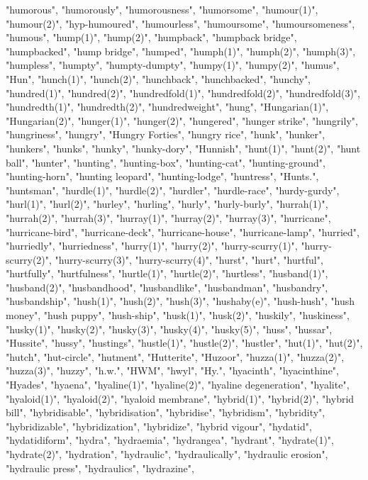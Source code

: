 "humorous",
"humorously",
"humorousness",
"humorsome",
"humour(1)",
"humour(2)",
"hyp-humoured",
"humourless",
"humoursome",
"humoursomeness",
"humous",
"hump(1)",
"hump(2)",
"humpback",
"humpback bridge",
"humpbacked",
"hump bridge",
"humped",
"humph(1)",
"humph(2)",
"humph(3)",
"humpless",
"humpty",
"humpty-dumpty",
"humpy(1)",
"humpy(2)",
"humus",
"Hun",
"hunch(1)",
"hunch(2)",
"hunchback",
"hunchbacked",
"hunchy",
"hundred(1)",
"hundred(2)",
"hundredfold(1)",
"hundredfold(2)",
"hundredfold(3)",
"hundredth(1)",
"hundredth(2)",
"hundredweight",
"hung",
"Hungarian(1)",
"Hungarian(2)",
"hunger(1)",
"hunger(2)",
"hungered",
"hunger strike",
"hungrily",
"hungriness",
"hungry",
"Hungry Forties",
"hungry rice",
"hunk",
"hunker",
"hunkers",
"hunks",
"hunky",
"hunky-dory",
"Hunnish",
"hunt(1)",
"hunt(2)",
"hunt ball",
"hunter",
"hunting",
"hunting-box",
"hunting-cat",
"hunting-ground",
"hunting-horn",
"hunting leopard",
"hunting-lodge",
"huntress",
"Hunts.",
"huntsman",
"hurdle(1)",
"hurdle(2)",
"hurdler",
"hurdle-race",
"hurdy-gurdy",
"hurl(1)",
"hurl(2)",
"hurley",
"hurling",
"hurly",
"hurly-burly",
"hurrah(1)",
"hurrah(2)",
"hurrah(3)",
"hurray(1)",
"hurray(2)",
"hurray(3)",
"hurricane",
"hurricane-bird",
"hurricane-deck",
"hurricane-house",
"hurricane-lamp",
"hurried",
"hurriedly",
"hurriedness",
"hurry(1)",
"hurry(2)",
"hurry-scurry(1)",
"hurry-scurry(2)",
"hurry-scurry(3)",
"hurry-scurry(4)",
"hurst",
"hurt",
"hurtful",
"hurtfully",
"hurtfulness",
"hurtle(1)",
"hurtle(2)",
"hurtless",
"husband(1)",
"husband(2)",
"husbandhood",
"husbandlike",
"husbandman",
"husbandry",
"husbandship",
"hush(1)",
"hush(2)",
"hush(3)",
"hushaby(e)",
"hush-hush",
"hush money",
"hush puppy",
"hush-ship",
"husk(1)",
"husk(2)",
"huskily",
"huskiness",
"husky(1)",
"husky(2)",
"husky(3)",
"husky(4)",
"husky(5)",
"huss",
"hussar",
"Hussite",
"hussy",
"hustings",
"hustle(1)",
"hustle(2)",
"hustler",
"hut(1)",
"hut(2)",
"hutch",
"hut-circle",
"hutment",
"Hutterite",
"Huzoor",
"huzza(1)",
"huzza(2)",
"huzza(3)",
"huzzy",
"h.w.",
"HWM",
"hwyl",
"Hy.",
"hyacinth",
"hyacinthine",
"Hyades",
"hyaena",
"hyaline(1)",
"hyaline(2)",
"hyaline degeneration",
"hyalite",
"hyaloid(1)",
"hyaloid(2)",
"hyaloid membrane",
"hybrid(1)",
"hybrid(2)",
"hybrid bill",
"hybridisable",
"hybridisation",
"hybridise",
"hybridism",
"hybridity",
"hybridizable",
"hybridization",
"hybridize",
"hybrid vigour",
"hydatid",
"hydatidiform",
"hydra",
"hydraemia",
"hydrangea",
"hydrant",
"hydrate(1)",
"hydrate(2)",
"hydration",
"hydraulic",
"hydraulically",
"hydraulic erosion",
"hydraulic press",
"hydraulics",
"hydrazine",
